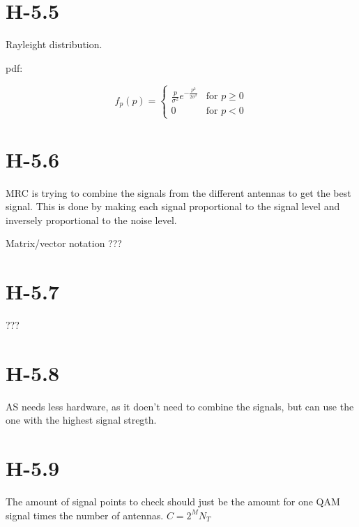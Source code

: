 \documentclass{article}
\begin{document}
\section{H-5.5}
Rayleight distribution.

pdf:

\begin{equation}
f_p(p) =
    \begin{cases}
        \frac{p}{\sigma^2} e^{-\frac{p^2}{2\sigma^2}} & \text{for } p \geq 0 \\
        0 & \text{for } p < 0
    \end{cases}
\end{equation}

\section{H-5.6}

MRC is trying to combine the signals from the different antennas to get the best signal.
This is done by making each signal proportional to the signal level and inversely proportional to the noise level.

Matrix/vector notation ???

\section{H-5.7}

???

\section{H-5.8}

AS needs less hardware, as it doen't need to combine the signals, but can use the one with the highest signal stregth.

\section{H-5.9}

The amount of signal points to check should just be the amount for one QAM signal times the number of antennas. $C = 2^M N_T$
\end{document}
